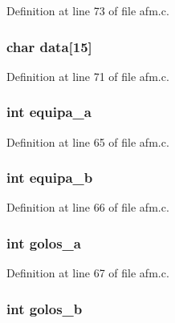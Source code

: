 \-Definition at line 73 of file afm.\-c.

\hypertarget{structresultado_acce83e0644113db018f05aca84f07da3}{
\subsubsection[{data}]{\setlength{\rightskip}{0pt plus 5cm}char {\bf data}\mbox{[}15\mbox{]}}}\label{structresultado_acce83e0644113db018f05aca84f07da3}


\-Definition at line 71 of file afm.\-c.

\hypertarget{structresultado_ace35f821369216c24a34e4fba3edb969}{
\subsubsection[{equipa\-\_\-a}]{\setlength{\rightskip}{0pt plus 5cm}int {\bf equipa\-\_\-a}}}\label{structresultado_ace35f821369216c24a34e4fba3edb969}


\-Definition at line 65 of file afm.\-c.

\hypertarget{structresultado_aa9b8d46539767a87ab56c46e6444c9d6}{
\subsubsection[{equipa\-\_\-b}]{\setlength{\rightskip}{0pt plus 5cm}int {\bf equipa\-\_\-b}}}\label{structresultado_aa9b8d46539767a87ab56c46e6444c9d6}


\-Definition at line 66 of file afm.\-c.

\hypertarget{structresultado_a4300e439183b959a6dc34ce8dd37cea5}{
\subsubsection[{golos\-\_\-a}]{\setlength{\rightskip}{0pt plus 5cm}int {\bf golos\-\_\-a}}}\label{structresultado_a4300e439183b959a6dc34ce8dd37cea5}


\-Definition at line 67 of file afm.\-c.

\hypertarget{structresultado_a81df81d30e7a4500b5aede428858019b}{
\subsubsection[{golos\-\_\-b}]{\setlength{\rightskip}{0pt plus 5cm}int {\bf golos\-\_\-b}}}\label{structresultado_a81df81d30e7a4500b5aede428858019b}


